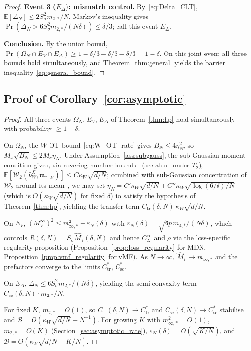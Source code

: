 \documentclass[11pt]{article}
\newcommand{\E}{\mathbb{E}}
\newcommand{\cW}{\mathcal{W}}
\newcommand{\cB}{\mathcal{B}}
\begin{document}
\begin{proof}
\textbf{Event 3 ($E_\Delta$): mismatch control.}
By~\eqref{eq:Delta_CLT}, $\E[\Delta_N] \le 2S_\sigma^2 m_{2,*}/N$.
Markov's inequality gives
$\Pr(\Delta_N > 6S_\sigma^2 m_{2,*}/(N\delta)) \le \delta/3$;
call this event $E_\Delta$.

\textbf{Conclusion.}
By the union bound,
$\Pr(\Omega_N \cap E_V \cap E_\Delta) \ge 1 - \delta/3 - \delta/3 - \delta/3 = 1-\delta$.
On this joint event all three bounds hold simultaneously, and
Theorem~\ref{thm:general} yields the barrier inequality~\eqref{eq:general_bound}.
\end{proof}

\subsection{Proof of Corollary~\ref{cor:asymptotic}}
\begin{proof}
All three events $\Omega_N$, $E_V$, $E_\Delta$ of Theorem~\ref{thm:hp}
hold simultaneously with probability $\ge 1-\delta$.

On $\Omega_N$, the $W$-OT bound~\eqref{eq:W_OT_rate} gives $B_N \le 4\eta_N^2$,
so $M_x\sqrt{B_N} \le 2M_x\eta_N$.
Under Assumption~\ref{ass:subgauss}, the sub-Gaussian moment condition
gives, via covering-number bounds~\cite{lei2020}
(see also~\cite[Theorem~2]{weed2019} under $T_2$),
$\E[\cW_2(\hat\nu_W^X,\mathfrak{m}_{*,W})]
\le C\kappa_W\sqrt{d/N}$;
combined with sub-Gaussian concentration of $\cW_2$
around its mean~\cite[Theorem~3.1]{weed2019},
we may set
$\eta_N = C'\kappa_W\sqrt{d/N}
+ C''\kappa_W\sqrt{\log(6/\delta)/N}$
(which is $O(\kappa_W\sqrt{d/N})$ for fixed $\delta$)
to satisfy the hypothesis of Theorem~\ref{thm:hp},
yielding the transfer term $C_{\mathrm{tr}}(\delta,N)\,\kappa_W\sqrt{d/N}$.

On $E_V$,
$(M_V^\infty)^2 \le m_{\infty,*}^2 + \varepsilon_N(\delta)$
with $\varepsilon_N(\delta) = \sqrt{6p\,m_{4,*}/(N\delta)}$,
which controls
$R(\delta,N) = S_\sigma \hat M_V(\delta,N)$
and hence $C_L^\infty$ and $\rho$ via the loss-specific regularity
proposition (Proposition~\ref{prop:loss_regularity} for MDN,
Proposition~\ref{prop:vmf_regularity} for vMF).
As $N \to \infty$, $\hat M_V \to m_{\infty,*}$ and the prefactors
converge to the limits $C_{\mathrm{tr}}^*$, $C_{\mathrm{sc}}^*$.

On $E_\Delta$, $\Delta_N \le 6S_\sigma^2 m_{2,*}/(N\delta)$, yielding
the semi-convexity term $C_{\mathrm{sc}}(\delta,N) \cdot m_{2,*}/N$.

For fixed $K$, $m_{2,*} = O(1)$, so $C_{\mathrm{tr}}(\delta,N) \to C_{\mathrm{tr}}^*$
and $C_{\mathrm{sc}}(\delta,N) \to C_{\mathrm{sc}}^*$ stabilise and
$\cB = O(\kappa_W\sqrt{d/N} + N^{-1})$.
For growing $K$ with $m_{\infty,*}^2 = O(1)$,
$m_{2,*} = O(K)$ (Section~\ref{sec:asymptotic_rate}),
$\varepsilon_N(\delta) = O(\sqrt{K/N})$, and
$\cB = O(\kappa_W\sqrt{d/N} + K/N)$.
\end{proof}
\end{document}
